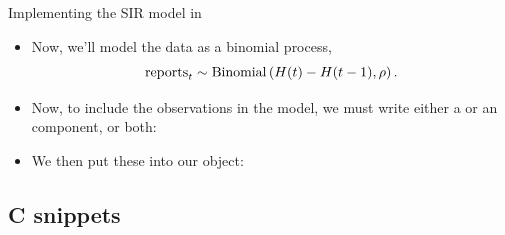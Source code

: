 \begin{frame}{Implementing the SIR model in }
\begin{itemize}
\item Now, we'll model the data as a binomial process,
  $$\mathrm{reports}_t \sim \mathrm{Binomial}\left(H(t)-H(t-1),\rho\right).$$

\item Now, to include the observations in the model, we must write either a  or an  component, or both:

\begin{knitrout}\small
{}\color{fgcolor}\begin{kframe}
\begin{alltt}
 \hlkwb{<-}  \hlstd{(}\hlstd{,} \hlstd{,} \hlstd{,} \hlstd{,} \hlstd{) \{}
  \hlstd{(}   
\hlstd{\}}

 \hlkwb{<-}  \hlstd{(}\hlstd{,} \hlstd{,} \hlstd{) \{}
  \hlstd{(}\hlstd{=}\hlstd{(}\hlstd{=}\hlstd{,}  
\hlstd{\}}
\end{alltt}
\end{kframe}
\end{knitrout}
  
\item We then put these into our  object:

\begin{knitrout}\small
{}\color{fgcolor}
\end{knitrout}
  

  
  \end{itemize}
\end{frame}

\subsection{C snippets}

